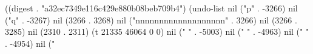 
((digest . "a32ec7349e116c429e880b08beb709b4") (undo-list nil ("p" . -3266) nil ("q" . -3267) nil (3266 . 3268) nil ("nnnnnnnnnnnnnnnnnnn" . 3266) nil (3266 . 3285) nil (2310 . 2311) (t 21335 46064 0 0) nil (" " . -5003) nil (" " . -4963) nil (" " . -4954) nil ("%

